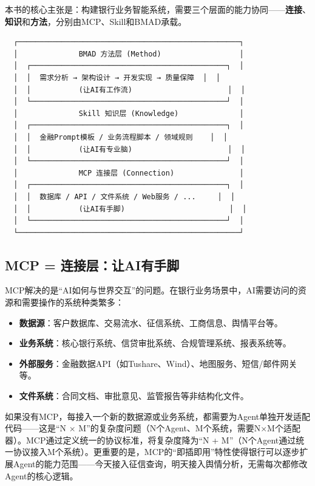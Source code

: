 本书的核心主张是：构建银行业务智能系统，需要三个层面的能力协同——\textbf{连接}、\textbf{知识}和\textbf{方法}，分别由MCP、Skill和BMAD承载。

\begin{verbatim}
  ┌───────────────────────────────────────────────────┐
  │              BMAD 方法层 (Method)                  │
  │  ┌─────────────────────────────────────────────┐  │
  │  │  需求分析 → 架构设计 → 开发实现 → 质量保障  │  │
  │  │           (让AI有工作流)                      │  │
  │  └─────────────────────────────────────────────┘  │
  │              Skill 知识层 (Knowledge)              │
  │  ┌─────────────────────────────────────────────┐  │
  │  │  金融Prompt模板 / 业务流程脚本 / 领域规则    │  │
  │  │           (让AI有专业脑)                      │  │
  │  └─────────────────────────────────────────────┘  │
  │              MCP 连接层 (Connection)               │
  │  ┌─────────────────────────────────────────────┐  │
  │  │  数据库 / API / 文件系统 / Web服务 / ...     │  │
  │  │           (让AI有手脚)                        │  │
  │  └─────────────────────────────────────────────┘  │
  └───────────────────────────────────────────────────┘
\end{verbatim}

\subsection{MCP = 连接层：让AI有手脚}

MCP解决的是``AI如何与世界交互''的问题。在银行业务场景中，AI需要访问的资源和需要操作的系统种类繁多：

\begin{itemize}[leftmargin=2em]
  \item \textbf{数据源}：客户数据库、交易流水、征信系统、工商信息、舆情平台等。
  \item \textbf{业务系统}：核心银行系统、信贷审批系统、合规管理系统、报表系统等。
  \item \textbf{外部服务}：金融数据API（如Tushare、Wind）、地图服务、短信/邮件网关等。
  \item \textbf{文件系统}：合同文档、审批意见、监管报告等非结构化文件。
\end{itemize}

如果没有MCP，每接入一个新的数据源或业务系统，都需要为Agent单独开发适配代码——这是``N $\times$ M''的复杂度问题（N个Agent、M个系统，需要N$\times$M个适配器）。MCP通过定义统一的协议标准，将复杂度降为``N + M''（N个Agent通过统一协议接入M个系统）。更重要的是，MCP的``即插即用''特性使得银行可以逐步扩展Agent的能力范围——今天接入征信查询，明天接入舆情分析，无需每次都修改Agent的核心逻辑。

